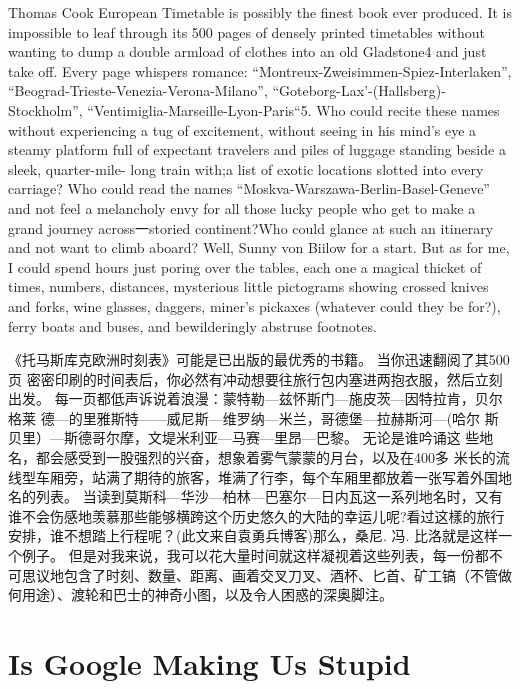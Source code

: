 \documentclass[cs4size, a4paper, 12pt]{article}
\newcounter{numpar}
\newcommand*{\newpar}{\numpar{}}
\begin{document}
	\newpar Thomas Cook European Timetable is possibly the finest book ever produced. It is impossible to leaf through its 500 pages of densely printed timetables without wanting to dump a double armload of clothes into an old Gladstone4 and just take off. Every page whispers romance: ``Montreux-Zweisimmen-Spiez-Interlaken'', ``Beograd-Trieste-Venezia-Verona-Milano'', ``Goteborg-Lax'-(Hallsberg)-Stockholm'', ``Ventimiglia-Marseille-Lyon-Paris``5. Who could recite these names without experiencing a tug of excitement, without seeing in his mind's eye a steamy platform full of expectant travelers and piles of luggage standing beside a sleek, quarter-mile- long train with;a list of exotic locations slotted into every carriage? Who could read the names ``Moskva-Warszawa-Berlin-Basel-Geneve'' and not feel a melancholy envy for all those lucky people who get to make a grand journey across一storied continent?Who could glance at such an itinerary and not want to climb aboard? Well, Sunny von Biilow for a start. But as for me, I could spend hours just poring over the tables, each one a magical thicket of times, numbers, distances, mysterious little pictograms showing crossed knives and forks, wine glasses, daggers, miner's pickaxes (whatever could they be for?), ferry boats and buses, and bewilderingly abstruse footnotes.
	
	《托马斯库克欧洲时刻表》可能是已出版的最优秀的书籍。 当你迅速翻阅了其500页 密密印刷的时间表后，你必然有冲动想要往旅行包内塞进两抱衣服，然后立刻出发。  每一页都低声诉说着浪漫：蒙特勒—兹怀斯门—施皮茨—因特拉肯，贝尔格莱 德—的里雅斯特——威尼斯—维罗纳—米兰，哥德堡—拉赫斯河—(哈尔 斯贝里）—斯德哥尔摩，文堤米利亚—马赛—里昂—巴黎。 无论是谁吟诵这 些地名，都会感受到一股强烈的兴奋，想象着雾气蒙蒙的月台，以及在400多 米长的流线型车厢旁，站满了期待的旅客，堆满了行李，每个车厢里都放着一张写着外国地名的列表。 当读到莫斯科—华沙—柏林—巴塞尔—日内瓦这一系列地名时，又有谁不会伤感地羡慕那些能够横跨这个历史悠久的大陆的幸运儿呢?看过这樣的旅行安排，谁不想踏上行程呢？(此文来自袁勇兵博客)那么，桑尼. 冯. 比洛就是这样一个例子。 但是对我来说，我可以花大量时间就这样凝视着这些列表，每一份都不可思议地包含了时刻、数量、距离、画着交叉刀叉、酒杯、匕首、矿工镐（不管做何用途）、渡轮和巴士的神奇小图，以及令人困惑的深奥脚注。 
	
	\section{Is Google Making Us Stupid}
	
	\setcounter{numpar}{0}
	
\end{document}
